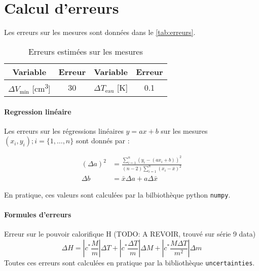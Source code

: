 \section{Calcul d'erreurs}
\label{sec:erreurs}

Les erreurs sur les mesures sont données dans le \autoref{tab:erreurs}.

\begin{table}[h]
    \centering
    \begin{tabulary}{\textwidth}{C C|C C}
        \toprule
        Variable & Erreur & Variable & Erreur \\
        \midrule
        \(\Delta V_\textrm{min}\) [\si{\centi\meter\cubed}] & 30 & \(\Delta T_\textrm{eau}\) [\si{\kelvin}] & 0.1 \\
        \bottomrule
    \end{tabulary}
    \caption{Erreurs estimées sur les mesures}
    \label{tab:erreurs}
\end{table}

\paragraph*{Regression linéaire}
Les erreurs sur les régressions linéaires \(y = ax + b\) sur les mesures \((x_i, y_i) ; i = \{1, \hdots, n\}\) sont donnés par \cite{erreursmesure}:

\begin{equation}
    \label{eq:erreur:fit}
    \begin{aligned}
        (\Delta a)^2 &= \frac{\sum_{i=1}^{n}(y_i - (a x_i + b))^2}{(n-2) \sum_{i=1}^{n}(x_i - \bar{x})^2}\\
        \Delta b &= \bar{x} \Delta a + a \Delta \bar{x}
    \end{aligned}
\end{equation}

En pratique, ces valeurs sont calculées par la bilbiothèque python \texttt{numpy}.

\paragraph*{Formules d'erreurs}

Erreur sur le pouvoir calorifique H (TODO: A REVOIR, trouvé sur série 9 data)
\begin{equation}
    \Delta H = \left|c^* \frac{M}{{m}}\right| \Delta T + \left| c^* \frac{{\Delta T}}{{m}}\right| \Delta M + \left| c^* \frac{M \Delta T}{m^2}\right| \Delta m
\end{equation}
Toutes ces erreurs sont calculées en pratique par la bibliothèque \texttt{uncertainties}.
